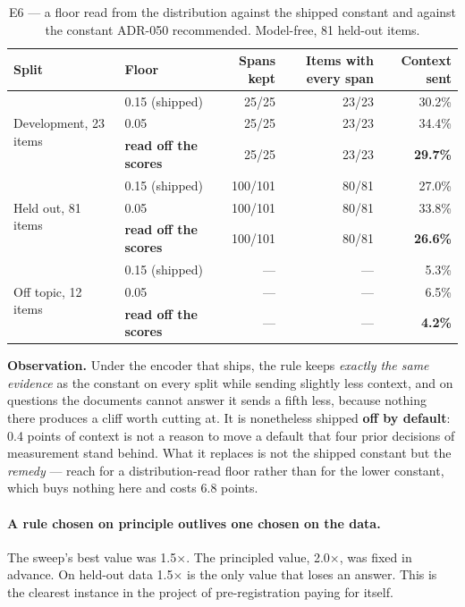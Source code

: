 \documentclass[11pt,a4paper]{article}
\newcommand{\obs}[1]{%
  \par\vspace{2pt}
  \noindent\begin{tcolorbox}[colback=soft,colframe=accent,boxrule=0pt,
    leftrule=2.2pt,arc=0pt,left=7pt,right=5pt,top=4pt,bottom=4pt,breakable]
  \small\textbf{Observation.} #1
  \end{tcolorbox}\par\vspace{2pt}}
\begin{document}
\begin{table}[htbp]
\centering
\caption{E6 --- a floor read from the distribution against the shipped constant
and against the constant ADR-050 recommended. Model-free, 81 held-out items.}
\label{tab:adaptive-floor}
\footnotesize
\begin{tabular}{@{}l l r r r@{}}
\toprule
\textbf{Split} & \textbf{Floor} & \textbf{Spans kept} &
\textbf{Items with every span} & \textbf{Context sent} \\
\midrule
\multirow{3}{*}{Development, 23 items}
  & 0.15 (shipped)          & 25/25 & 23/23 & 30.2\% \\
  & 0.05                    & 25/25 & 23/23 & 34.4\% \\
  & \textbf{read off the scores} & 25/25 & 23/23 & \textbf{29.7\%} \\
\midrule
\multirow{3}{*}{Held out, 81 items}
  & 0.15 (shipped)          & 100/101 & 80/81 & 27.0\% \\
  & 0.05                    & 100/101 & 80/81 & 33.8\% \\
  & \textbf{read off the scores} & 100/101 & 80/81 & \textbf{26.6\%} \\
\midrule
\multirow{3}{*}{Off topic, 12 items}
  & 0.15 (shipped)          & --- & --- & 5.3\% \\
  & 0.05                    & --- & --- & 6.5\% \\
  & \textbf{read off the scores} & --- & --- & \textbf{4.2\%} \\
\bottomrule
\end{tabular}
\end{table}

\obs{Under the encoder that ships, the rule keeps \emph{exactly the same
evidence} as the constant on every split while sending slightly less context,
and on questions the documents cannot answer it sends a fifth less, because
nothing there produces a cliff worth cutting at. It is nonetheless shipped
\textbf{off by default}: 0.4 points of context is not a reason to move a default
that four prior decisions of measurement stand behind. What it replaces is not
the shipped constant but the \emph{remedy} --- reach for a distribution-read floor
rather than for the lower constant, which buys nothing here and costs 6.8
points.}

\paragraph{A rule chosen on principle outlives one chosen on the data.}
The sweep's best value was 1.5$\times$. The principled value, 2.0$\times$, was
fixed in advance. On held-out data 1.5$\times$ is the only value that loses an
answer. This is the clearest instance in the project of pre-registration paying
for itself.
\end{document}
